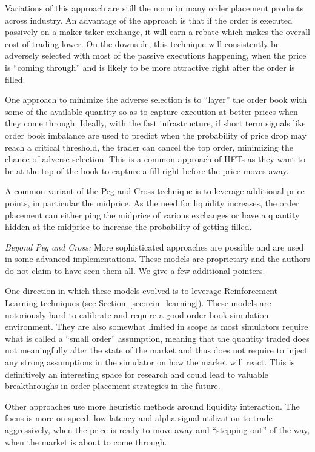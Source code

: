 Variations of this approach are still the norm in many order placement products across industry. An advantage of the approach is that if the order is executed passively on a maker-taker exchange, it will earn a rebate which makes the overall cost of trading lower. On the downside, this technique will consistently be adversely selected with most of the passive executions happening, when the price is ``coming through'' and is likely to be more attractive right after the order is filled.


One approach to minimize the adverse selection is to ``layer'' the order book with some of the available quantity so as to capture execution at better prices when they come through. Ideally, with the fast infrastructure, if short term signals like order book imbalance are used to predict when the probability of price drop may reach a critical threshold, the trader can cancel the top order, minimizing the chance of adverse selection. This is a common approach of HFTs as they want to be at the top of the book to capture a fill right before the price moves away.


A common variant of the Peg and Cross technique is to leverage additional price points, in particular the midprice. As the need for liquidity increases, the order placement can either ping the midprice of various exchanges or have a quantity hidden at the midprice to increase the probability of getting filled. \twomedskip


\noindent\emph{Beyond Peg and Cross:} More sophisticated approaches are possible and are used in some advanced implementations. These models are proprietary and the authors do not claim to have seen them all. We give a few additional pointers.


One direction in which these models evolved is to leverage Reinforcement Learning techniques (see Section~\ref{sec:rein_learning}). These models are notoriously hard to calibrate and require a good order book simulation environment. They are also somewhat limited in scope as most simulators require what is called a ``small order'' assumption, meaning that the quantity traded does not meaningfully alter the state of the market and thus does not require to inject any strong assumptions in the simulator on how the market will react. This is definitively an interesting space for research and could lead to valuable breakthroughs in order placement strategies in the future.


Other approaches use more heuristic methods around liquidity interaction. The focus is more on speed, low latency and alpha signal utilization to trade aggressively, when the price is ready to move away and ``stepping out'' of the way, when the market is about to come through.


